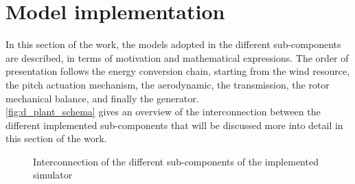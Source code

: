 \newpage
\section{Model implementation}\label{sec:c_basic_model_model}
In this section of the work, the models adopted in the different sub-components are described, in terms of motivation and mathematical expressions. The order of presentation follows the energy conversion chain, starting from the wind resource, the pitch actuation mechanism, the aerodynamic, the transmission, the rotor mechanical balance, and finally the generator. \\
\autoref{fig:d_plant_schema} gives an overview of the interconnection between the different implemented sub-components that will be discussed more into detail in this section of the work.
\begin{figure}[htb]
  \centering
  
  \caption{Interconnection of the different sub-components of the implemented simulator}
  \label{fig:d_plant_schema}
\end{figure}

